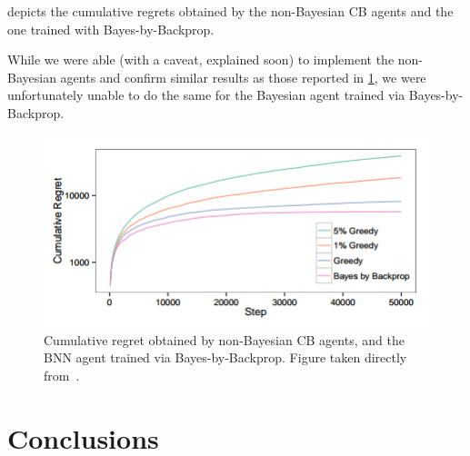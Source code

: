 \documentclass[11pt]{article}
\begin{document}
 depicts the cumulative regrets obtained by the
non-Bayesian CB agents and the one trained with Bayes-by-Backprop.  

While we were able (with a caveat, explained soon) to implement the
non-Bayesian agents and confirm similar results as those reported in
\cref{fig:cb_cumregret}, we were unfortunately unable to do the same for the
Bayesian agent trained via Bayes-by-Backprop.



\begin{figure}
  \centering\includegraphics[width=.5\textwidth]{figures/cb_cumregret.png}
  \caption{Cumulative regret obtained by non-Bayesian CB agents, and the BNN
  agent trained via Bayes-by-Backprop.  Figure taken directly
  from~\cite{blundell}.}\label{fig:cb_cumregret}
\end{figure}


\section{Conclusions}


 
\end{document}
